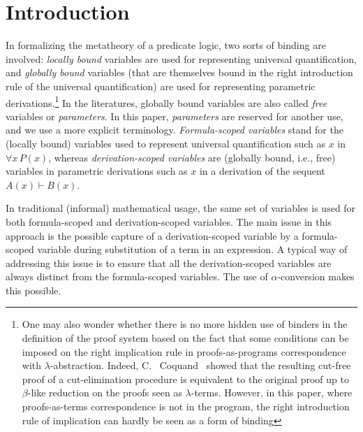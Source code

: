 \documentclass{svjour3}                     %
\begin{document}
\section{Introduction}
In formalizing the metatheory of a predicate logic, two sorts of binding are involved: \textit{locally bound} variables are used for representing universal quantification, and {\em globally bound} variables (that are themselves bound in the right introduction rule of the universal quantification) are used for representing parametric derivations.\footnote{One may also wonder whether there is no more hidden use of binders in the definition of the proof system based on the fact that some conditions can be imposed on the right implication rule in proofs-as-programs correspondence with $\lambda$-abstraction. Indeed, C.~ Coquand~\cite{cCoquand93} showed that the resulting cut-free proof of a cut-elimination procedure is equivalent to the original proof up to $\beta$-like reduction on the proofs seen as $\lambda$-terms. However, in this paper, where proofs-as-terms correspondence is not in the program, the right introduction rule of implication can hardly be seen as a form of binding}
In the literatures, globally bound variables are also called {\em free} variables or {\em parameters}. In this paper, \textit{parameters} are reserved for another use, and we use a more explicit terminology. {\em Formula-scoped variables} stand for the (locally bound) variables used to represent universal quantification such as $x$ in $\forall x\, P(x)$, whereas {\em derivation-scoped variables} are (globally bound, i.e., free) variables in parametric derivations such as $x$ in a derivation of the sequent $A(x) \vdash B(x)$.

In traditional (informal) mathematical usage, the same set of variables is used for both  formula-scoped and derivation-scoped variables. The main issue in this approach is the possible capture of a derivation-scoped variable by a formula-scoped variable during substitution of a term in an expression. A typical way of addressing this issue is to ensure that all the derivation-scoped variables are always distinct from the formula-scoped variables. The use of $\alpha$-conversion makes this possible.

\end{document}
